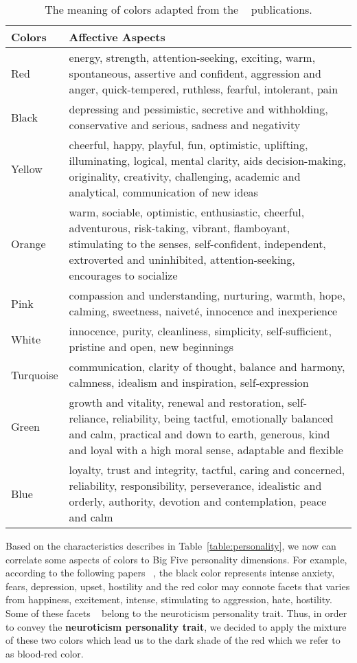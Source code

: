 \begin{table} [h]
\centering
\begin{tabular}{ | m{8em} | m{25em}| } 
\hline
\textbf{Colors} & \textbf{Affective Aspects}  \\
\hline
Red & energy, strength, attention-seeking, exciting, warm, spontaneous, assertive and confident,
aggression and anger, quick-tempered, ruthless, fearful, intolerant, pain  \\
\hline 
Black & depressing and pessimistic, secretive and withholding, conservative and serious,
sadness and negativity  \\
\hline 
Yellow & cheerful, happy, playful, fun, optimistic, uplifting, illuminating, logical, mental clarity,
aids decision-making, originality, creativity, challenging, academic and analytical, communication of new ideas   \\
\hline 
Orange & warm, sociable, optimistic, enthusiastic, cheerful, adventurous, risk-taking, vibrant,
flamboyant, stimulating to the senses,  self-confident, independent, extroverted and uninhibited,
attention-seeking, encourages to socialize  \\
\hline 
Pink & compassion and understanding, nurturing, warmth, hope, calming, sweetness,
naiveté, innocence and inexperience  \\
\hline
White & innocence, purity, cleanliness, simplicity, self-sufficient, pristine and open, new beginnings  \\
\hline
Turquoise &  communication, clarity of thought, balance and harmony, calmness,
idealism and inspiration, self-expression \\
\hline
Green & growth and vitality, renewal and restoration, self-reliance, reliability,
being tactful, emotionally balanced and calm, practical and down to earth, generous, kind and loyal
with a high moral sense, adaptable and flexible  \\
\hline
Blue &  loyalty, trust and integrity, tactful, caring and concerned, reliability, responsibility,
perseverance, idealistic and orderly, authority, devotion and contemplation, peace and calm \\
\hline
\end{tabular}
\caption{The meaning of colors adapted from the ~\cite{luscher1971luscher,cerrato2012meaning, alschuler1943easel,schaie1961scaling} publications.}
\label{table:color}
\end{table}

Based on the characteristics describes in Table~\ref{table:personality},
we now can correlate some aspects of colors to Big Five personality dimensions.
For example, according to the following papers ~\cite{alschuler1943easel,schaie1961scaling},
the black color represents intense anxiety, fears, depression, upset, hostility and the red color may
connote facets that varies from happiness, excitement, intense, stimulating to aggression, hate, hostility.
Some of these facets ~\cite{costa1988catalog} belong to the neuroticism personality trait.
Thus, in order to convey the \textbf{neuroticism personality trait}, we decided to apply the
mixture of these two colors which lead us to the dark shade of the red which we refer to as blood-red color.

